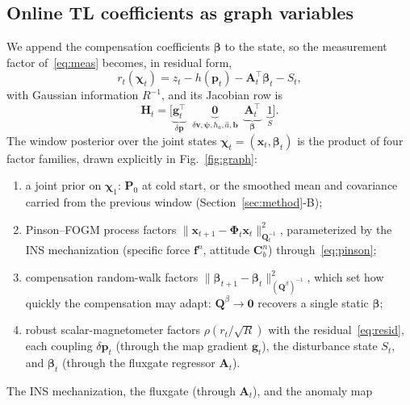 \documentclass{IEEEtaes}
\begin{document}
\subsection{Online TL coefficients as graph variables}
We append the compensation coefficients $\boldsymbol{\beta}$ to the state, so the
measurement factor of~\eqref{eq:meas} becomes, in residual form,
\begin{equation}
r_t(\boldsymbol{\chi}_t)=z_t-h(\mathbf{p}_t)-\mathbf{A}_t^{\top}\boldsymbol{\beta}_t-S_t,
\label{eq:resid}
\end{equation}
with Gaussian information $R^{-1}$, and its Jacobian row is
\begin{equation}
\mathbf{H}_t=\Big[\underbrace{\mathbf{g}_t^{\top}}_{\delta\mathbf{p}}\;\;
\underbrace{\mathbf{0}}_{\delta\mathbf{v},\boldsymbol{\psi},h_a,\hat{a},\mathbf{b}}\;\;
\underbrace{\mathbf{A}_t^{\top}}_{\boldsymbol{\beta}}\;\;
\underbrace{1}_{S}\Big].
\label{eq:jac}
\end{equation}
The window posterior over the joint states
$\boldsymbol{\chi}_t=(\mathbf{x}_t,\boldsymbol{\beta}_t)$ is the product of four
factor families, drawn explicitly in Fig.~\ref{fig:graph}:
\begin{enumerate}
  \item a joint prior on $\boldsymbol{\chi}_1$: $\mathbf{P}_0$ at cold
        start, or the smoothed mean and covariance carried from the previous
        window (Section~\ref{sec:method}-B);
  \item Pinson--FOGM process factors
        $\lVert\mathbf{x}_{t+1}-\boldsymbol{\Phi}_t\mathbf{x}_t\rVert^2_{\mathbf{Q}_t^{-1}}$,
        parameterized by the INS mechanization (specific force $\mathbf{f}^n$,
        attitude $\mathbf{C}^n_b$) through~\eqref{eq:pinson};
  \item compensation random-walk factors
        $\lVert\boldsymbol{\beta}_{t+1}-\boldsymbol{\beta}_t\rVert^2_{(\mathbf{Q}^{\beta})^{-1}}$,
        which set how quickly the compensation may adapt:%
        $\mathbf{Q}^{\beta}\!\to\!\mathbf{0}$ recovers a single static
        $\boldsymbol{\beta}$;
  \item robust scalar-magnetometer factors $\rho(r_t/\sqrt{R})$
        with the residual~\eqref{eq:resid}, each coupling $\delta\mathbf{p}_t$
        (through the map gradient $\mathbf{g}_t$), the disturbance state $S_t$,
        and $\boldsymbol{\beta}_t$ (through the fluxgate regressor
        $\mathbf{A}_t$).
\end{enumerate}
The INS mechanization, the fluxgate (through $\mathbf{A}_t$), and the anomaly map
\end{document}
